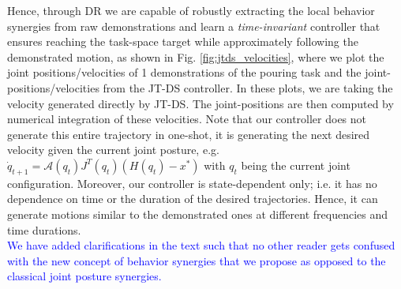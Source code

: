 \documentclass{article}
\begin{document}
\begin{enumerate}
Hence, through DR we are capable of robustly extracting the local behavior synergies from raw demonstrations and learn a \textit{time-invariant} controller that ensures reaching the task-space target while approximately following the demonstrated motion, as shown in Fig. \ref{fig:jtds_velocities}, where we plot the joint positions/velocities of 1 demonstrations of the pouring task and the joint-positions/velocities from the JT-DS controller. In these plots, we are taking the velocity generated directly by JT-DS. The joint-positions are then computed by numerical integration of these velocities. Note that our controller does not generate this entire trajectory in one-shot, it is generating the next desired velocity given the current joint posture, e.g. $\dot{q}_{t+1} = \mathcal{A}(q_{t})J^T(q_{t})(H(q_{t})-x^*)$ with $q_t$ being the current joint configuration. Moreover, our controller is state-dependent only; i.e. it has no dependence on time or the duration of the desired trajectories. Hence, it can generate motions similar to the demonstrated ones at different frequencies and time durations. \\

\noindent \textcolor{blue}{We have added clarifications in the text such that no other reader gets confused with the new concept of behavior synergies that we propose as opposed to the classical joint posture synergies.}


\end{enumerate}
\end{document}
